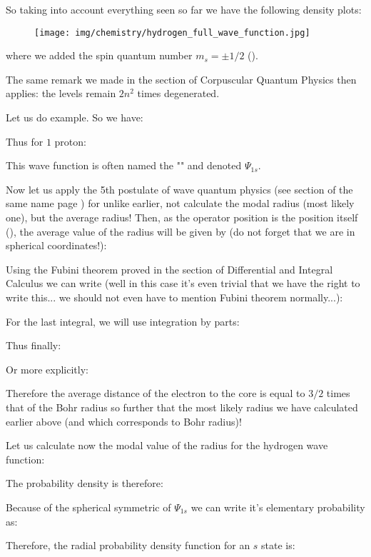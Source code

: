 	
	So taking into account everything seen so far we have the following density plots:
	\begin{figure}[H]
		\centering
		\texttt{[image: img/chemistry/hydrogen\_full\_wave\_function.jpg]}	
	\end{figure}
	
	where we added the spin quantum number $m_s=\pm 1/2$ ().

	The same remark we made in the section of Corpuscular Quantum Physics then applies: the levels remain $2n^2$ times degenerated.

	Let us do example. So we have:
	
	Thus for $1$ proton:
	
	This wave function is often named the "" and denoted $\Psi_{1s}$.
	
	Now let us apply the 5th postulate of wave quantum physics (see section of the same name page \pageref{fifth postulate of wave quantum physics}) for unlike earlier, not calculate the modal radius (most likely one), but the average radius! Then, as the operator position is the position itself (), the average value of the radius will be given by (do not forget that we are in spherical coordinates!):
	
	Using the Fubini theorem proved in the section of Differential and Integral Calculus we can write (well in this case it's even trivial that we have the right to write this... we should not even have to mention Fubini theorem normally...):
	
	For the last integral, we will use integration by parts:
	
	Thus finally:
	
	Or more explicitly:
	
	Therefore the average distance of the electron to the core is equal to $3/2$ times that of the Bohr radius so further that the most likely radius we have calculated earlier above (and which corresponds to Bohr radius)!
	
	Let us calculate now the modal value of the radius for the hydrogen wave function:
	
	The probability density is therefore:
	
	Because of the spherical symmetric of $\Psi_{1s}$ we can write it's elementary probability as:
	
	Therefore, the radial probability density function for an $s$ state is:
	
